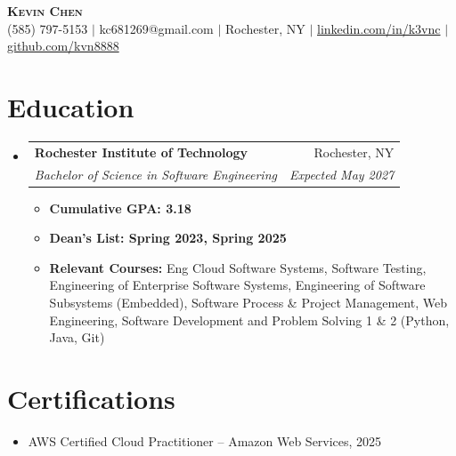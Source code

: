 \documentclass[letterpaper,11pt]{article}
\makeatletter
\newcommand{\resumeItem}[1]{
  \item\small{
    {#1 \vspace{-2pt}}
  }
}
\newcommand{\resumeSubheading}[4]{
  \vspace{-2pt}\item
    \begin{tabular*}{0.97\textwidth}[t]{l@{\extracolsep{\fill}}r}
      \textbf{#1} & #2 \\
      \textit{\small#3} & \textit{\small #4} \\
    \end{tabular*}\vspace{-7pt}
}
\newcommand{\resumeSubHeadingListStart}{\begin{itemize}[leftmargin=0.15in, label={}]}\newcommand{\resumeSubHeadingListEnd}{\end{itemize}}
\newcommand{\resumeItemListStart}{\begin{itemize}}
\newcommand{\resumeItemListEnd}{\end{itemize}\vspace{-5pt}}
\makeatother
\begin{document}
\begin{center}
    \textbf{\Huge \scshape Kevin Chen} \\ \vspace{1pt}
    \small (585) 797-5153 $|$ kc681269@gmail.com $|$ Rochester, NY $|$ 
    \href{https://www.linkedin.com/in/k3vnc/}{linkedin.com/in/k3vnc} $|$ 
    \href{https://github.com/kvn8888}{github.com/kvn8888}
\end{center}

\section{Education}
  \resumeSubHeadingListStart
    \resumeSubheading
      {Rochester Institute of Technology}{Rochester, NY}
      {Bachelor of Science in Software Engineering}{Expected May 2027}
      \resumeItemListStart
        \resumeItem{\textbf{Cumulative GPA: 3.18}}
        \resumeItem{\textbf{Dean's List: Spring 2023, Spring 2025}}
        \resumeItem{\textbf{Relevant Courses:} Eng Cloud Software Systems, Software Testing, Engineering of Enterprise Software Systems, Engineering of Software Subsystems (Embedded), Software Process \& Project Management, Web Engineering, Software Development and Problem Solving 1 \& 2 (Python, Java, Git)}
      \resumeItemListEnd
  \resumeSubHeadingListEnd

\section{Certifications}
  \resumeSubHeadingListStart
    \resumeItem{AWS Certified Cloud Practitioner -- Amazon Web Services, 2025}
  \resumeSubHeadingListEnd

\end{document}
